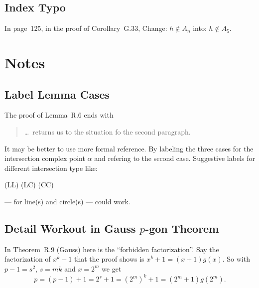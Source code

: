 \subsection*{Index Typo}

In page~125, in the proof of Corollary~G.33,
Change: \(h\notin A_n\)
into: \(h\notin A_5\).


\section{Notes}

\subsection{Label Lemma Cases}

The proof of Lemma~R.6 ends with
\begin{quotation}
\ldots\  returns us to the situation fo the second paragraph.
\end{quotation}

It may be better to use more formal reference.
By labeling the three cases for the intersection complex point \(\alpha\)
and refering to the second case.
Suggestive labels for different intersection type like:
\begin{center}
(LL) \quad (LC) \quad (CC)
\end{center}
--- for line(s) and circle(s) --- could work.


\subsection{Detail Workout in Gauss \ensuremath{p}-gon Theorem}

In Theorem~R.9 (Gauss) here is the ``forbidden factorization''.
Say the factorization of \(x^k+1\) that the proof shows is
\(x^k+1 = (x+1)g(x)\).
So with \(p-1 = s^2\), \(s=mk\) and \(x=2^m\) we get
\begin{equation*}
p = (p - 1) + 1 = 2^s + 1 = \left(2^m\right)^k + 1 = (2^m+1)g(2^m).
\end{equation*}

